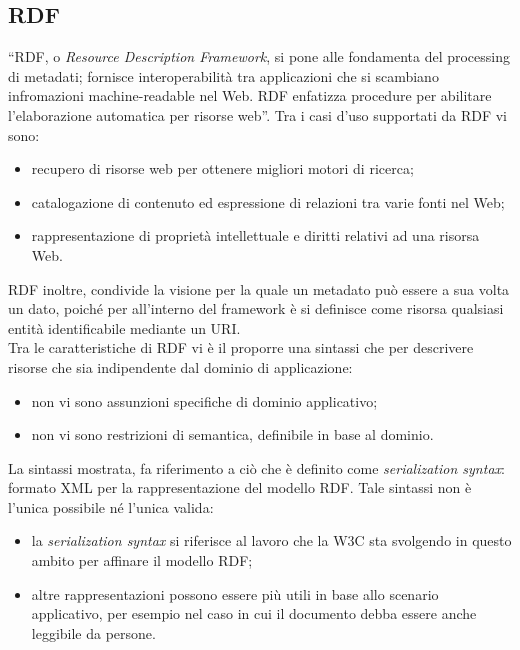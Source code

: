 \documentclass[12pt,a4paper,twoside]{book}
\begin{document}
\subsection{RDF}
``RDF, o \textit{Resource Description Framework}, si pone alle fondamenta del processing di metadati; fornisce interoperabilità tra applicazioni che si scambiano infromazioni machine-readable nel Web. RDF enfatizza procedure per abilitare l'elaborazione automatica per risorse web''\cite{RDF}. Tra i casi d'uso supportati da RDF vi sono:
\begin{itemize}
\item recupero di risorse web per ottenere migliori motori di ricerca;
\item catalogazione di contenuto ed espressione di relazioni tra varie fonti nel Web;
\item rappresentazione di proprietà intellettuale e diritti relativi ad una risorsa Web.
\end{itemize}
RDF inoltre, condivide la visione per la quale un metadato può essere a sua volta un dato, poiché per all'interno del framework è si definisce come risorsa qualsiasi entità identificabile mediante un URI.\\
Tra le caratteristiche di RDF vi è il proporre una sintassi che per descrivere risorse che sia indipendente dal dominio di applicazione: 
\begin{itemize}
\item non vi sono assunzioni specifiche di dominio applicativo;
\item non vi sono restrizioni di semantica, definibile in base al dominio.
\end{itemize}
La sintassi mostrata, fa riferimento a ciò che è definito come \textit{serialization syntax}: formato XML per la rappresentazione del modello RDF. Tale sintassi non è l'unica possibile né l'unica valida:
\begin{itemize}
\item la \textit{serialization syntax} si riferisce al lavoro che la W3C sta svolgendo in questo ambito per affinare il modello RDF;
\item altre rappresentazioni possono essere più utili in base allo scenario applicativo, per esempio nel caso in cui il documento debba essere anche leggibile da persone.
\end{itemize}
\end{document}
